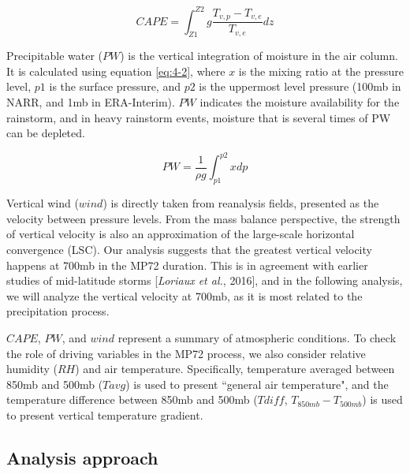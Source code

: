 \begin{equation}
CAPE = \int_{Z1}^{Z2} {g\frac{{{T_{v,p}} - {T_{v,e}}}}{{{T_{v,e}}}}dz}
\label{eq:4-1}
\end{equation}

Precipitable water ($PW$) is the vertical integration of moisture in the air column. It is calculated using equation \ref{eq:4-2}, where $x$ is the mixing ratio at the pressure level, $p1$ is the surface pressure, and $p2$ is the uppermost level pressure (100mb in NARR, and 1mb in ERA-Interim). $PW$ indicates the moisture availability for the rainstorm, and in heavy rainstorm events, moisture that is several times of PW can be depleted.

\begin{equation}
PW = \frac{1}{{\rho g}}\int_{p1}^{p2} {xdp}
\label{eq:4-2}
\end{equation}

Vertical wind ($wind$) is directly taken from reanalysis fields, presented as the velocity between pressure levels. From the mass balance perspective, the strength of vertical velocity is also an approximation of the large-scale horizontal convergence (LSC). Our analysis suggests that the greatest vertical velocity happens at 700mb in the MP72 duration. This is in agreement with earlier studies of mid-latitude storms [\textit{Loriaux et al.}, 2016], and in the following analysis, we will analyze the vertical velocity at 700mb, as it is most related to the precipitation process.

$CAPE$, $PW$, and $wind$ represent a summary of atmospheric conditions. To check the role of driving variables in the MP72 process, we also consider relative humidity ($RH$) and air temperature. Specifically, temperature averaged between 850mb and 500mb ($Tavg$) is used to present ``general air temperature", and the temperature difference between 850mb and 500mb ($Tdiff$, $T_{850mb}-T_{500mb}$) is used to present vertical temperature gradient.

\subsection{Analysis approach}

